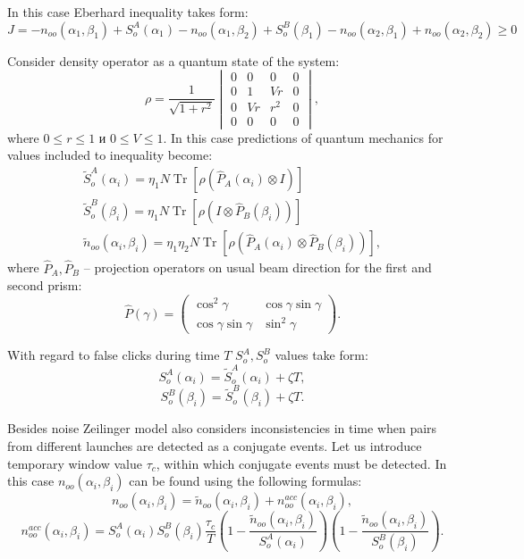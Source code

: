 \documentclass[11pt]{article}
\DeclareMathOperator{\Tr}{Tr}
\begin{document}
In this case Eberhard inequality takes form:
\begin{equation}
J = -n_{oo}(\alpha_1, \beta_1) + S_o^A(\alpha_1) - n_{oo}(\alpha_1, \beta_2) + S_o^B(\beta_1) - n_{oo}(\alpha_2, \beta_1) + n_{oo}(\alpha_2, \beta_2) \geq 0
\label{eq:Zeilinger_J}
\end{equation}

Consider density operator as a quantum state of the system:
\[
\rho = \frac{1}{\sqrt{1+r^2}}
\begin{vmatrix}
0 & 0 & 0 & 0\\
0 & 1 & Vr & 0\\
0 & Vr & r^2 & 0\\
0 & 0 & 0 & 0
\end{vmatrix},
\]
where $0 \leq r \leq 1$ и $0 \leq V \leq 1$.
In this case predictions of quantum mechanics for values included to inequality become:
\begin{eqnarray*}
\tilde{S}_o^A(\alpha_i) = \eta_1 N \Tr[\rho(\hat{P}_A(\alpha_i) \otimes I)]\\
\tilde{S}_o^B(\beta_i) = \eta_1 N \Tr[\rho(I \otimes \hat{P}_B(\beta_i))]\\
\tilde{n}_{oo}(\alpha_i, \beta_i) = \eta_1\eta_2 N \Tr[\rho(\hat{P}_A(\alpha_i) \otimes \hat{P}_B(\beta_i))],
\end{eqnarray*}
where $\hat{P}_A, \hat{P}_B$ -- projection operators on usual beam direction for the first and second prism:
\[
\hat{P}(\gamma) = 
\begin{pmatrix}
\cos^2\gamma & \cos\gamma\sin\gamma\\
\cos\gamma\sin\gamma & \sin^2\gamma
\end{pmatrix}.
\]

With regard to false clicks during time $T$ $S_o^A, S_o^B$ values take form:
\[
S_o^A(\alpha_i) = \tilde{S}_o^A(\alpha_i) + \zeta T,
\]
\[
S_o^B(\beta_i) = \tilde{S}_o^B(\beta_i) + \zeta T.
\]

Besides noise Zeilinger model also considers inconsistencies in time when pairs from different 
launches are detected as a conjugate events. Let us introduce temporary window value $\tau_c$, within 
which conjugate events must be detected. In this case $n_{oo}(\alpha_i, \beta_i)$ can be found using 
the following formulas:
\[
n_{oo}(\alpha_i, \beta_i) = \tilde{n}_{oo}(\alpha_i, \beta_i) + n_{oo}^{acc}(\alpha_i, \beta_i),
\]
\[
n_{oo}^{acc}(\alpha_i, \beta_i) = S_o^A(\alpha_i)S_o^B(\beta_i)\frac{\tau_c}{T}\left(1 - \frac{\tilde{n}_{oo}(\alpha_i, \beta_i)}{S_o^A(\alpha_i)}\right) \left( 1 - \frac{\tilde{n}_{oo}(\alpha_i, \beta_i)}{S_o^B(\beta_i)}\right).
\]
\end{document}
